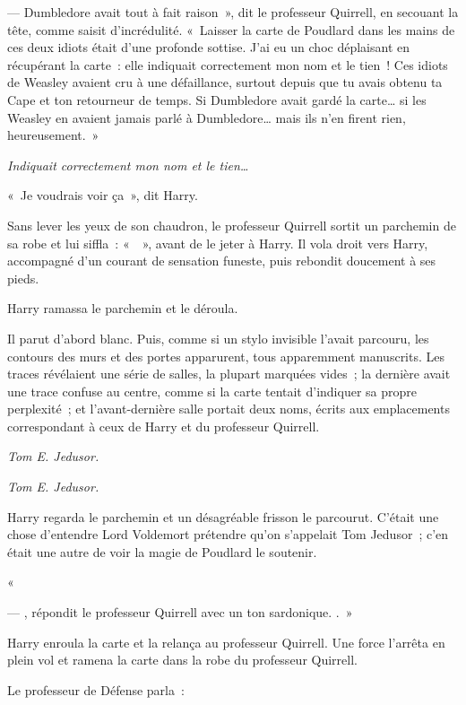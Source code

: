 --- Dumbledore avait tout à fait raison~», dit le professeur Quirrell, en secouant la tête, comme saisit d'incrédulité.
«~Laisser la carte de Poudlard dans les mains de ces deux idiots était d'une profonde sottise.
J'ai eu un choc déplaisant en récupérant la carte~: elle indiquait correctement mon nom et le tien~!
Ces idiots de Weasley avaient cru à une défaillance, surtout depuis que tu avais obtenu ta Cape et ton retourneur de temps.
Si Dumbledore avait gardé la carte… si les Weasley en avaient jamais parlé à Dumbledore… mais ils n'en firent rien, heureusement.~»

\emph{Indiquait correctement mon nom et le tien…}

«~Je voudrais voir ça~», dit Harry.

Sans lever les yeux de son chaudron, le professeur Quirrell sortit un parchemin de sa robe et lui siffla~: «~~», avant de le jeter à Harry.
Il vola droit vers Harry, accompagné d'un courant de sensation funeste, puis rebondit doucement à ses pieds.

Harry ramassa le parchemin et le déroula.

Il parut d'abord blanc.
Puis, comme si un stylo invisible l'avait parcouru, les contours des murs et des portes apparurent, tous apparemment manuscrits.
Les traces révélaient une série de salles, la plupart marquées vides~; la dernière avait une trace confuse au centre, comme si la carte tentait d'indiquer sa propre perplexité~; et l'avant-dernière salle portait deux noms, écrits aux emplacements correspondant à ceux de Harry et du professeur Quirrell.

\emph{Tom E.
Jedusor.}

\emph{Tom E.
Jedusor.}

Harry regarda le parchemin et un désagréable frisson le parcourut.
C'était une chose d'entendre Lord Voldemort prétendre qu'on s'appelait Tom Jedusor~; c'en était une autre de voir la magie de Poudlard le soutenir.

«~

--- , répondit le professeur Quirrell avec un ton sardonique.
.~»

Harry enroula la carte et la relança au professeur Quirrell.
Une force l'arrêta en plein vol et ramena la carte dans la robe du professeur Quirrell.

Le professeur de Défense parla~:

